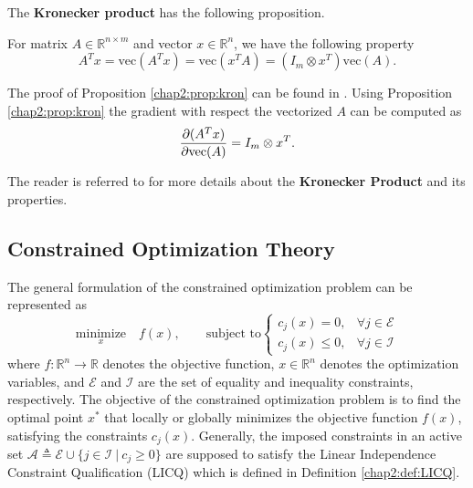 The \textbf{Kronecker product} has the following proposition.

\begin{proposition}
  For matrix $A\in\mathbb R^{n\times m}$ and vector $x\in\mathbb R^n$, we have the following property
  \begin{equation}
    A^Tx = \text{vec}(A^Tx) = \text{vec}(x^TA) = (I_m\otimes x^T)\text{vec}(A)
    .
  \end{equation}
  \label{chap2:prop:kron}
\end{proposition}
The proof of Proposition \ref{chap2:prop:kron} can be found in \cite{RN22}.
Using Proposition \ref{chap2:prop:kron} the gradient with respect the vectorized $A$ can be computed as
\begin{equation}
  {\partial (A^Tx)\over\partial \text{vec}(A)} = I_m\otimes x^T
  .
\end{equation}

The reader is referred to \cite[Chapter 7]{RN22} for more details about the \textbf{Kronecker Product} and its properties.

\subsection{Constrained Optimization Theory} 

The general formulation of the constrained optimization problem can be represented as 
\begin{equation}
    \underset{x}{\text{minimize}}\quad f(x),
    \quad\quad
    \text{subject to}
    \begin{cases}
      c_j(x)= 0,    & \forall j\in\mathcal E\\
      c_j(x)\leq 0, & \forall j\in\mathcal I 
    \end{cases}
\end{equation}
where $f:\mathbb R^n\to\mathbb R$ denotes the objective function, $x\in\mathbb R^n$ denotes the optimization variables, and $\mathcal E$ and $\mathcal I$ are the set of equality and inequality constraints, respectively.
The objective of the constrained optimization problem is to find the optimal point $x^*$ that locally or globally minimizes the objective function $f(x)$, satisfying the constraints $c_j(x)$.
Generally, the imposed constraints in an active set $\mathcal A\triangleq\mathcal E \cup \{j\in\mathcal I\ \vert \ c_j\ge0\}$ are supposed to satisfy the Linear Independence Constraint Qualification (LICQ) which is defined in Definition \ref{chap2:def:LICQ}.

